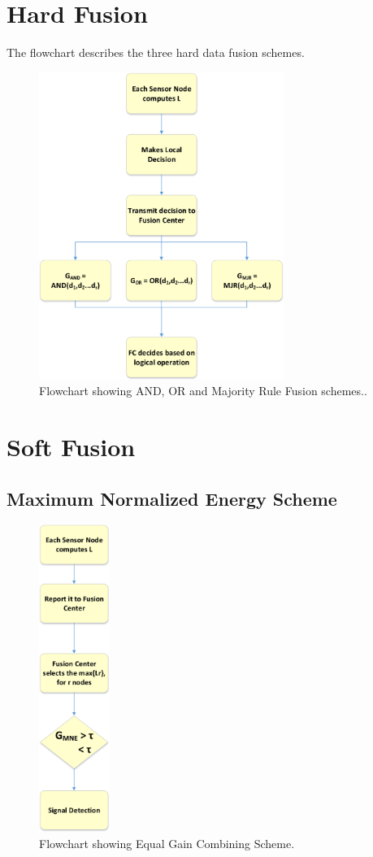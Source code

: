 \section{Hard Fusion}
\label{hardfusion}
The flowchart describes the three hard data fusion schemes.
\begin{figure}[ht!]
	\centering
	\includegraphics[width=\textwidth,height=10cm,keepaspectratio]{images/Gill/figs/hardfusion.eps}
\caption{Flowchart showing AND, OR and Majority Rule Fusion schemes..} 
\label{hard}      
\end{figure}


\section{Soft Fusion}

\subsection{Maximum Normalized Energy Scheme}

\begin{figure}[ht!]
	\centering
	\includegraphics[width=\textwidth,height=10cm,keepaspectratio]{images/Gill/figs/mnescheme.eps}
\caption{Flowchart showing Equal Gain Combining Scheme.} 
\label{mnescheme}      
\end{figure}

